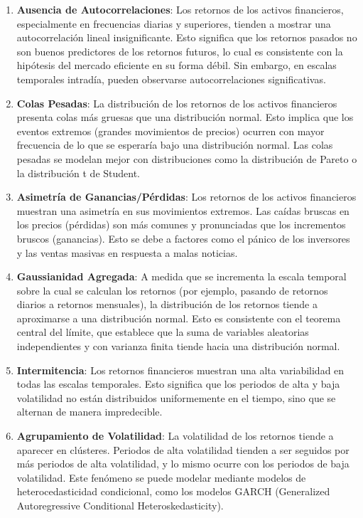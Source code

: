 \documentclass[a4paper,12pt, twoside]{report}
\begin{document}
\begin{enumerate}
    \item \textbf{Ausencia de Autocorrelaciones}: Los retornos de los activos financieros, especialmente en 
    frecuencias diarias y superiores, tienden a mostrar una autocorrelación lineal insignificante. Esto significa 
    que los retornos pasados no son buenos predictores de los retornos futuros, lo cual es consistente con la hipótesis 
    del mercado eficiente en su forma débil. Sin embargo, en escalas temporales intradía, pueden observarse autocorrelaciones significativas.
    \item \textbf{Colas Pesadas}: La distribución de los retornos de los activos financieros presenta colas más gruesas que una distribución 
    normal. Esto implica que los eventos extremos (grandes movimientos de precios) ocurren con mayor frecuencia de lo que se esperaría bajo 
    una distribución normal. Las colas pesadas se modelan mejor con distribuciones como la distribución de Pareto o la distribución t de Student.
    \item \textbf{Asimetría de Ganancias/Pérdidas}: Los retornos de los activos financieros muestran una asimetría en sus movimientos extremos. 
    Las caídas bruscas en los precios (pérdidas) son más comunes y pronunciadas que los incrementos bruscos (ganancias). Esto se debe a factores 
    como el pánico de los inversores y las ventas masivas en respuesta a malas noticias.
    \item \textbf{Gaussianidad Agregada}: A medida que se incrementa la escala temporal sobre la cual se calculan los retornos (por ejemplo, 
    pasando de retornos diarios a retornos mensuales), la distribución de los retornos tiende a aproximarse a una distribución normal. Esto es 
    consistente con el teorema central del límite, que establece que la suma de variables aleatorias independientes y con varianza finita tiende 
    hacia una distribución normal.
    \item \textbf{Intermitencia}: Los retornos financieros muestran una alta variabilidad en todas las escalas temporales. Esto significa que 
    los periodos de alta y baja volatilidad no están distribuidos uniformemente en el tiempo, sino que se alternan de manera impredecible.
    \item \textbf{Agrupamiento de Volatilidad}: La volatilidad de los retornos tiende a aparecer en clústeres. Periodos de alta volatilidad 
    tienden a ser seguidos por más periodos de alta volatilidad, y lo mismo ocurre con los periodos de baja volatilidad. Este fenómeno se 
    puede modelar mediante modelos de heterocedasticidad condicional, como los modelos GARCH (Generalized Autoregressive Conditional 
    Heteroskedasticity).
\end{enumerate}
\end{document}
